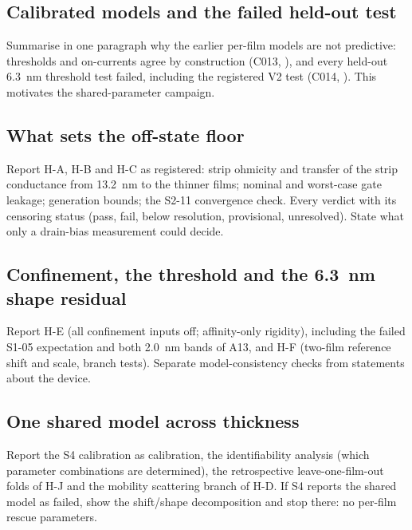 \documentclass[11pt]{article}
\begin{document}
\subsection{Calibrated models and the failed held-out test}
\label{sec:r-history}
\begin{pdIntent}
Summarise in one paragraph why the earlier per-film models are not predictive: thresholds and on-currents agree by
construction (C013, ), and every held-out \SI{6.3}{nm} threshold test failed, including the registered
V2 test (C014, ). This motivates the shared-parameter campaign. %
\end{pdIntent}

\subsection{What sets the off-state floor}
\label{sec:r-floor}
\begin{pdIntent}
Report H-A, H-B and H-C as registered: strip ohmicity and transfer of the strip conductance from \SI{13.2}{nm} to the
thinner films; nominal and worst-case gate leakage; generation bounds; the S2-11 convergence check. Every verdict with
its censoring status (pass, fail, below resolution, provisional, unresolved). State what only a drain-bias measurement
could decide.
\end{pdIntent}
 

\subsection{Confinement, the threshold and the \texorpdfstring{\SI{6.3}{nm}}{6.3 nm} shape residual}
\label{sec:r-confinement}
\begin{pdIntent}
Report H-E (all confinement inputs off; affinity-only rigidity), including the failed S1-05 expectation and both
\SI{2.0}{nm} bands of A13, and H-F (two-film reference shift and scale, branch tests). Separate model-consistency
checks from statements about the device. %
\end{pdIntent}
 

\subsection{One shared model across thickness}
\label{sec:r-shared}
\begin{pdIntent}
Report the S4 calibration as calibration, the identifiability analysis (which parameter combinations are determined),
the retrospective leave-one-film-out folds of H-J and the mobility scattering branch of H-D. If S4 reports the shared
model as failed, show the shift/shape decomposition and stop there: no per-film rescue parameters. %
\end{pdIntent}
 
\end{document}
